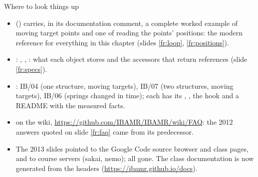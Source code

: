 \documentclass[aspectratio=169,11pt]{beamer}
\begin{document}
\begin{frame}{Where to look things up}
\label{fr:lookup}
\small
\begin{itemize}
  \item {} () carries, in its documentation comment, a complete worked example of moving target points and one of reading the points' positions: the modern reference for everything in this chapter (slides \ref{fr:loop}, \ref{fr:positions}).
  \item {}: , , : what each object stores and the accessors that return references (slide \ref{fr:specs}).
  \item {}: IB/04 (one structure, moving targets), IB/07 (two structures, moving targets), IB/06 (springs changed in time); each has its , , the  hook and a README with the measured facts.
  \item {} on the wiki, \url{https://github.com/IBAMR/IBAMR/wiki/FAQ}: the 2012 answers quoted on slide \ref{fr:faq} came from its predecessor.
  \item The 2013 slides pointed to the Google Code source browser and class pages, and to course servers (sakai, nemo); all gone. The class documentation is now generated from the headers (\url{https://ibamr.github.io/docs}).
\end{itemize}
\end{frame}
\end{document}
